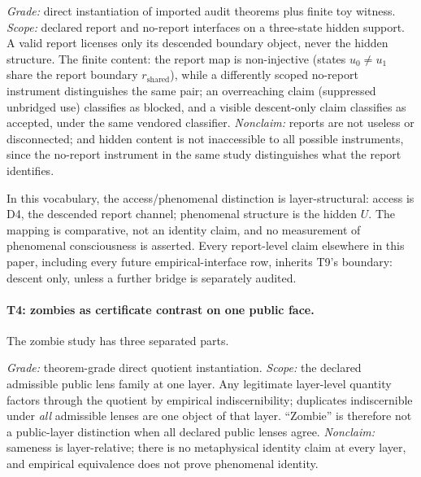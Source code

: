 \begin{theorem}
\gradeS{} \emph{Grade:} direct instantiation of imported audit theorems plus
finite toy witness. \emph{Scope:} declared report and no-report interfaces on
a three-state hidden support. A valid report licenses only its descended
boundary object, never the hidden structure. The finite content: the report
map is non-injective (states $u_0 \neq u_1$ share the report boundary
$r_{\mathrm{shared}}$), while a differently scoped no-report instrument
distinguishes the same pair; an overreaching claim (suppressed unbridged use)
classifies as blocked, and a visible descent-only claim classifies as
accepted, under the same vendored classifier. \emph{Nonclaim:} reports are
not useless or disconnected; and hidden content is not inaccessible to all
possible instruments, since the no-report instrument in the same study
distinguishes what the report identifies.
\end{theorem}

In this vocabulary, the access/phenomenal distinction \citep{Block1995} is
layer-structural: access is D4, the descended report channel; phenomenal
structure is the hidden $U$. The mapping is comparative, not an identity
claim, and no measurement of phenomenal consciousness is asserted. Every
report-level claim elsewhere in this paper, including every future
empirical-interface row, inherits T9's boundary: descent only, unless a
further bridge is separately audited.

\paragraph{T4: zombies as certificate contrast on one public face.}
The zombie study has three separated parts.

\begin{theorem}
\gradeS{} \emph{Grade:} theorem-grade direct quotient instantiation.
\emph{Scope:} the declared admissible public lens family at one layer. Any
legitimate layer-level quantity factors through the quotient by empirical
indiscernibility; duplicates indiscernible under \emph{all} admissible lenses
are one object of that layer. ``Zombie'' is therefore not a public-layer
distinction when all declared public lenses agree. \emph{Nonclaim:} sameness
is layer-relative; there is no metaphysical identity claim at every layer, and
empirical equivalence does not prove phenomenal identity.
\end{theorem}

